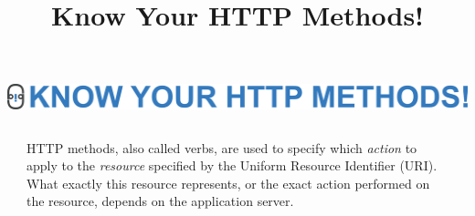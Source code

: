 \documentclass[final]{beamer}
\title{\Large Know Your HTTP Methods!}
\begin{document}
  \begin{frame}{}
    \begin{minipage}{\textwidth}
      \centering
      \includegraphics[]{./title-methods.png}
    \end{minipage}
    
    \vspace{0.5in}

    \begin{columns}
      \begin{column}{0.1\textwidth}
      \end{column}
      \begin{column}{0.8\textwidth}
        \begin{block}{}
          \huge
            HTTP methods, also called verbs, are used to specify which \emph{action}
            to apply to the  \emph{resource} specified by the Uniform Resource
            Identifier (URI). What exactly this resource represents, or the exact
            action performed on the resource, depends on the application server.
          \normalsize
        \end{block}
      \end{column}
      \begin{column}{0.1\textwidth}
      \end{column}
    \end{columns}

    \vspace{0.5in}


\end{frame}
\end{document}

